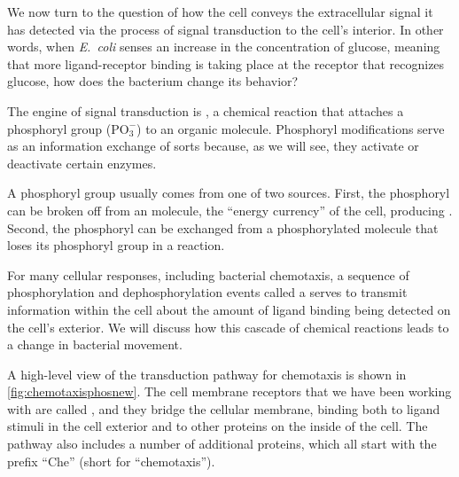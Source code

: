 We now turn to the question of how the cell conveys the extracellular signal it has detected via the process of signal transduction to the cell's interior. In other words, when \textit{E.~coli} senses an increase in the concentration of glucose, meaning that more ligand-receptor binding is taking place at the receptor that recognizes glucose, how does the bacterium change its behavior?

The engine of signal transduction is , a chemical reaction that attaches a phosphoryl group ($\text{PO}_3^{-}$) to an organic molecule.  Phosphoryl modifications serve as an information exchange of sorts because, as we will see, they activate or deactivate certain enzymes.

A phosphoryl group usually comes from one of two sources. First, the phosphoryl can be broken off from an  molecule, the ``energy currency'' of the cell, producing . Second, the phosphoryl can be exchanged from a phosphorylated molecule that loses its phosphoryl group in a  reaction.

For many cellular responses, including bacterial chemotaxis, a sequence of phosphorylation and dephosphorylation events called a  serves to transmit information within the cell about the amount of ligand binding being detected on the cell's exterior. We will discuss how this cascade of chemical reactions leads to a change in bacterial movement.

A high-level view of the transduction pathway for chemotaxis is shown in \autoref{fig:chemotaxisphosnew}. The cell membrane receptors that we have been working with are called , and they bridge the cellular membrane, binding both to ligand stimuli in the cell exterior and to other proteins on the inside of the cell. The pathway also includes a number of additional proteins, which all start with the prefix ``Che'' (short for ``chemotaxis'').

